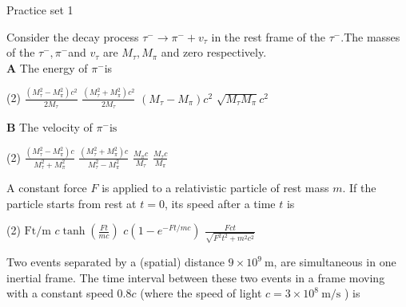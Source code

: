\newpage
\begin{abox}
	Practice set 1
	\end{abox}
\begin{enumerate}
\begin{minipage}{\textwidth}
	\item Consider the decay process $\tau^{-} \rightarrow \pi^{-}+v_{\tau}$ in the rest frame of the $\tau^{-} .$The masses of the $\tau^{-}, \pi^{-}$and $v_{\tau}$ are $M_{\tau}, M_{\pi}$ and zero respectively.\\
	\textbf{A} The energy of $\pi^{-}$is
\end{minipage}
\begin{tasks}(2)
	\task[\textbf{A.}] $\frac{\left(M_{\tau}^{2}-M_{\pi}^{2}\right) c^{2}}{2 M_{\tau}}$
	\task[\textbf{B.}]$\frac{\left(M_{\tau}^{2}+M_{\pi}^{2}\right) c^{2}}{2 M_{\tau}}$
	\task[\textbf{C.}]$\left(M_{\tau}-M_{\pi}\right) c^{2}$
	\task[\textbf{D.}]$\sqrt{M_{\tau} M_{\pi}} c^{2}$
\end{tasks}
\textbf{B} The velocity of  $\pi^{-} \text {is }$
\begin{tasks}(2)
	\task[\textbf{A.}] $\frac{\left(M_{\tau}^{2}-M_{\pi}^{2}\right) c}{M_{\tau}^{2}+M_{\pi}^{2}}$
	\task[\textbf{B.}]$\frac{\left(M_{\tau}^{2}+M_{\pi}^{2}\right) c}{M_{\tau}^{2}-M_{\pi}^{2}}$ 
	\task[\textbf{C.}] $\frac{M_{\pi} c}{M_{\tau}}$
	\task[\textbf{D.}]$\frac{M_{\tau} c}{M_{\pi}}$
\end{tasks}
\begin{minipage}{\textwidth}
	\item A constant force $F$ is applied to a relativistic particle of rest mass $m$. If the particle starts from rest at $t=0$, its speed after a time $t$ is
\end{minipage}
\begin{tasks}(2)
	\task[\textbf{A.}] $\mathrm{Ft} / \mathrm{m}$
	\task[\textbf{B.}]$c \tanh \left(\frac{F t}{m c}\right)$
	\task[\textbf{C.}]$c\left(1-e^{-F t / m c}\right)$
	\task[\textbf{D.}]$\frac{F c t}{\sqrt{F^{2} t^{2}+m^{2} c^{2}}}$
\end{tasks}
\begin{minipage}{\textwidth}
	\item Two events separated by a (spatial) distance $9 \times 10^{9} \mathrm{~m}$, are simultaneous in one inertial frame. The time interval between these two events in a frame moving with a constant speed $0.8 c$ (where the speed of light $c=3 \times 10^{8} \mathrm{~m} / \mathrm{s}$ ) is
\end{minipage}

\end{enumerate}
